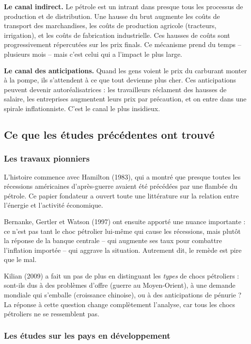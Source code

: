 \documentclass[12pt,a4paper]{article}
\begin{document}
\textbf{Le canal indirect.} Le pétrole est un intrant dans presque tous les processus de production et de distribution. Une hausse du brut augmente les coûts de transport des marchandises, les coûts de production agricole (tracteurs, irrigation), et les coûts de fabrication industrielle. Ces hausses de coûts sont progressivement répercutées sur les prix finals. Ce mécanisme prend du temps -- plusieurs mois -- mais c'est celui qui a l'impact le plus large.

\textbf{Le canal des anticipations.} Quand les gens voient le prix du carburant monter à la pompe, ils s'attendent à ce que tout devienne plus cher. Ces anticipations peuvent devenir autoréalisatrices : les travailleurs réclament des hausses de salaire, les entreprises augmentent leurs prix par précaution, et on entre dans une spirale inflationniste. C'est le canal le plus insidieux.

\subsection{Ce que les études précédentes ont trouvé}

\subsubsection{Les travaux pionniers}

L'histoire commence avec Hamilton (1983), qui a montré que presque toutes les récessions américaines d'après-guerre avaient été précédées par une flambée du pétrole. Ce papier fondateur a ouvert toute une littérature sur la relation entre l'énergie et l'activité économique.

Bernanke, Gertler et Watson (1997) ont ensuite apporté une nuance importante : ce n'est pas tant le choc pétrolier lui-même qui cause les récessions, mais plutôt la réponse de la banque centrale -- qui augmente ses taux pour combattre l'inflation importée -- qui aggrave la situation. Autrement dit, le remède est pire que le mal.

Kilian (2009) a fait un pas de plus en distinguant les \emph{types} de chocs pétroliers : sont-ils dus à des problèmes d'offre (guerre au Moyen-Orient), à une demande mondiale qui s'emballe (croissance chinoise), ou à des anticipations de pénurie ? La réponse à cette question change complètement l'analyse, car tous les chocs pétroliers ne se ressemblent pas.

\subsubsection{Les études sur les pays en développement}
\end{document}
